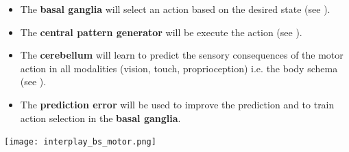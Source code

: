 \documentclass[portrait,final,a0paper,fontscale=0.33]{baposter}
\begin{document}
\begin{poster}
{\begin{adjustbox}{minipage=0.95\textwidth, margin=5pt, center}
	\begin{minipage}[l]{0.5\textwidth}
		\begin{itemize}
		\item The \textbf{basal ganglia} will select an action based on the desired state (see \cite{baladronHabitLearningHierarchical2020}).
		\item The \textbf{central pattern generator} will be execute the action (see \cite{nassourConcreteActionRepresentation2020}).
		\item The \textbf{cerebellum} will learn to predict the sensory consequences of the motor action in all modalities (vision, touch, proprioception) i.e. the body schema (see \cite{schmidForwardModelsCerebellum2019}). 
		\item The \textbf{prediction error} will be used to improve the prediction and to train action selection in the \textbf{basal ganglia}.
		\end{itemize}
	\end{minipage}
	\begin{minipage}[r]{0.5\textwidth}
		\raggedleft
		\texttt{[image: interplay\_bs\_motor.png]}
	\end{minipage}

	
	\vspace{0.3em}
	\end{adjustbox}
}

\end{poster}
\end{document}
